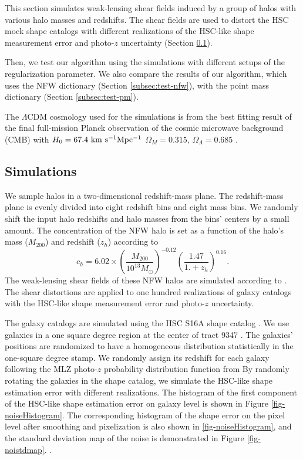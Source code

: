 \documentclass[twocolumn]{aastex62}
\begin{document}
This section simulates weak-lensing shear fields induced by a group of halos
with various halo masses and redshifts. The shear fields are used to distort
the HSC mock shape catalogs with different realizations of the HSC-like shape
measurement error and photo-$z$ uncertainty (Section \ref{subsec:Sims}).

Then, we test our algorithm using the simulations with different setups of the
regularization parameter. We also compare the results of our algorithm, which
uses the NFW dictionary (Section \ref{subsec:test-nfw}), with the point mass
dictionary (Section \ref{subsec:test-pm}).

The $\Lambda$CDM cosmology used for the simulations is from the best fitting
result of the final full-mission Planck observation of the cosmic microwave
background (CMB) with $H_0=67.4 ~\rm{km~s^{-1} Mpc^{-1}}$ $\Omega_M=0.315$,
$\Omega_\Lambda=0.685$ \citep{cmb-Planck2018-Cosmology}.

\subsection{Simulations}
\label{subsec:Sims}

We sample halos in a two-dimensional redshift-mass plane. The redshift-mass
plane is evenly divided into eight redshift bins and eight mass bins. We
randomly shift the input halo redshifts and halo masses from the bins' centers
by a small amount. The concentration of the NFW halo is set as a function of
the halo's mass ($M_{200}$) and redshift ($z_{h}$) according to
\citet{c-M_Magneticum-Ragagnin2019}
\begin{equation}
c_{h}=6.02\times(\frac{M_{200}}{10^{13} M_{\odot}})^{-0.12}(\frac{1.47}{1.+z_h})^{0.16}.
\end{equation}
The weak-lensing shear fields of these NFW halos are simulated according to
\citet{haloModel-TJ2003-3pt}. The shear distortions are applied to one hundred
realizations of galaxy catalogs with the HSC-like shape measurement error and
photo-$z$ uncertainty.

The galaxy catalogs are simulated using the HSC S16A shape catalog
\citep{HSC1-catalog}.  We use galaxies in a one square degree region at the
center of tract 9347 \citep{HSC1-data}.  The galaxies' positions are randomized
to have a homogeneous distribution statistically in the one-square
degree stamp. We randomly assign its redshift for each galaxy following the
MLZ photo-$z$ probability distribution function from By randomly rotating the
galaxies in the shape catalog, we simulate the HSC-like shape estimation error
with different realizations.  The histogram of the first component of the
HSC-like shape estimation error on galaxy level is shown in Figure
\ref{fig-noiseHistogram}.  The corresponding histogram of the shape error on
the pixel level after smoothing and pixelization is also shown in
\ref{fig-noiseHistogram}, and the standard deviation map of the noise is
demonstrated in Figure \ref{fig-noistdmap}.  \citep{HSC1-photoz}.
\end{document}
